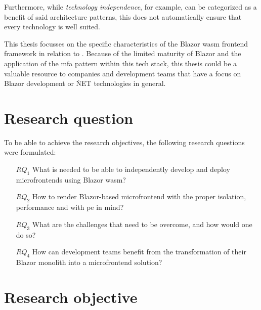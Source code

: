Furthermore, while \textit{technology independence}, for example, can be
categorized as a benefit of said architecture patterns, this does not
automatically ensure that every technology is well suited. 

This thesis focusses on the specific characteristics of the Blazor \gls{wasm}
\gls{frontend} framework in relation to . Because of
the limited maturity of Blazor and the application of the \gls{mfa} pattern
within this tech stack, this thesis could be a valuable resource to companies
and development teams that have a focus on Blazor development or \.NET
technologies in general.

\section{Research question}
\label{sec:research-question}


To be able to achieve the research objectives, the following research questions
were formulated:

\begin{itemize}
  \item[$RQ_1$] What is needed to be able to independently develop and deploy
  microfrontends using Blazor \gls{wasm}?
  \item[$RQ_2$] How to render Blazor-based \gls{microfrontend} with the proper
  isolation, performance and with \gls{pe} in mind?
  \item[$RQ_3$] What are the challenges that need to be overcome, and how would
  one do so? 
  \item[$RQ_4$] How can development teams benefit from the transformation of
  their Blazor monolith into a microfrontend solution?
\end{itemize}

\section{Research objective}
\label{sec:research-objective}


